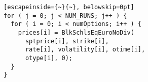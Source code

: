 \begin{lstlisting}[escapeinside={~}{~}, belowskip=0pt]
for ( j = 0; j < NUM_RUNS; j++ ) {
  for ( i = 0; i < numOptions; i++ ) {
    prices[i] = BlkSchlsEqEuroNoDiv(
      sptprice[i], strike[i],
      rate[i], volatility[i], otime[i],
      otype[i], 0);
  }
}
\end{lstlisting}
